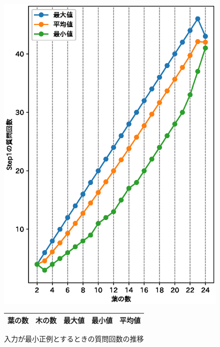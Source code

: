\begin{figure}[tb]
  \begin{center}
    \includegraphics[scale=0.7]{fig/fig-qltimes_input_twice.eps}
    \caption{入力が最小正例とするときの質問回数の推移}\label{fig:qltimes_input_twice}
  \vspace*{10.5pt}
    \label{tbl:qltimes_input_twice}
    \begin{tabular}{rrrrr} \hline
      葉の数 &   木の数 & 最大値 & 最小値  & 平均値 \\ \hline\hline

\end{tabular}
\end{center}
\end{figure}
